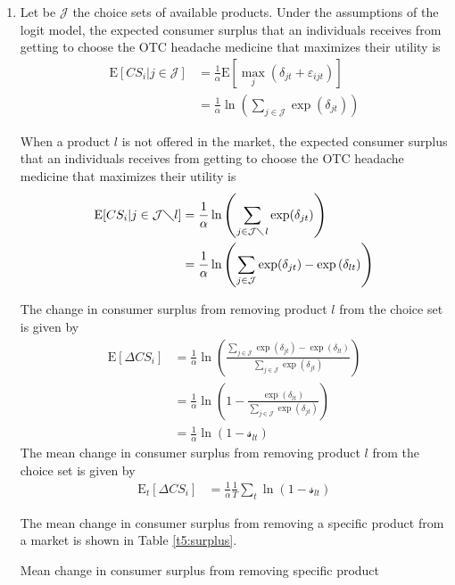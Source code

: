 \documentclass{article}
\newcommand{\E}{\text{E}}
\begin{document}
\begin{enumerate}
\begin{table}[H]
\centering
\caption{Mean own price elasticity for different product across specifications}\label{t4:elasticity}
\begin{threeparttable}

\end{threeparttable}
\end{table}

\item Let be $\mathcal{J}$ the choice sets of available products. Under the assumptions of the logit model, the expected consumer surplus that an individuals receives
from getting to choose the OTC headache medicine that maximizes their utility is
\begin{align*}
\E[CS_i|j\in \mathcal{J}]&=\frac{1}{\alpha} \E[\max_j (\delta_{jt}+\varepsilon_{ijt})]\\
&=\frac{1}{\alpha} \ln\left(\sum_{j\in \mathcal{J}}\exp(\delta_{jt})\right)
\end{align*}

When a product $l$ is not offered in the market, the expected consumer surplus that an individuals receives from getting to choose the OTC headache medicine that maximizes their utility is
\begin{align*}
    \E[CS_i|j\in \mathcal{J}\diagdown l]&=\frac{1}{\alpha} \ln\left(\sum_{j\in \mathcal{J}\diagdown l}\exp(\delta_{jt})\right)\\
    &=\frac{1}{\alpha} \ln\left(\sum_{j\in \mathcal{J}}\exp(\delta_{jt})-\exp{(\delta_{lt})}\right)
\end{align*}

The change in consumer surplus from removing product $l$ from the choice set is given by
\begin{align*}
    \E[\Delta CS_i]&=\frac{1}{\alpha} \ln\left(\frac{\sum_{j\in \mathcal{J}}\exp(\delta_{jt})-\exp{(\delta_{lt})}}{\sum_{j\in \mathcal{J}}\exp{(\delta_{jt})}}\right)\\
    &=\frac{1}{\alpha}\ln\left(1-\frac{\exp{(\delta_{lt})}}{\sum_{j\in \mathcal{J}}\exp{(\delta_{jt})}}\right)\\
    &=\frac{1}{\alpha}\ln\left(1-\mathcal{s}_{lt}\right)
\end{align*}
The mean change in consumer surplus from removing product $l$ from the choice set is given by
\begin{align*}
    \E_t[\Delta CS_i]&=\frac{1}{\alpha} \frac{1}{T}\sum_{t}\ln\left(1-\mathcal{s}_{lt}\right)
\end{align*}

The mean change in consumer surplus from removing a specific product from a market is shown in Table \ref{t5:surplus}.

\begin{table}[H]
\centering
\caption{Mean change in consumer surplus from removing specific product}\label{t5:surplus}
\begin{threeparttable}

\end{threeparttable}
\end{table}

\end{enumerate}
\end{document}
